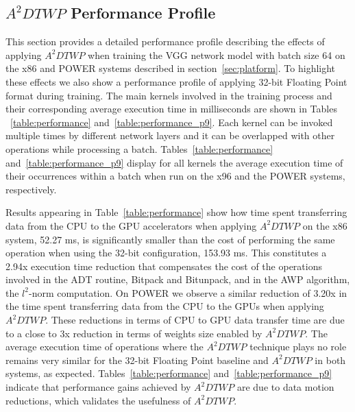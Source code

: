 \subsection{$A^2DTWP$ Performance Profile}
\label{sec:performance}
This section provides a detailed performance profile describing the effects of 
applying $A^2DTWP$ when training the VGG network model with batch size 64 on the x86 and POWER systems described in section~\ref{sec:platform}.
To highlight these effects we also show a performance profile of applying 32-bit 
Floating Point format during training.
The main kernels involved in the training process and their corresponding average execution time in milliseconds are shown in Tables ~\ref{table:performance} and~\ref{table:performance_p9}.
Each kernel can be invoked multiple times by different network layers and it can be overlapped with other operations while processing a batch.
Tables~\ref{table:performance} and~\ref{table:performance_p9} display for all kernels the average execution time of their occurrences within a batch when run on the x96 and the POWER systems, respectively.

Results appearing in Table~\ref{table:performance} show how time spent transferring 
data from the CPU to the GPU accelerators when applying $A^2DTWP$ on the x86 system, 52.27 ms, 
is significantly smaller than the cost of performing the same operation when using the 32-bit configuration, 153.93 ms. 
This constitutes a 2.94x execution time reduction that compensates the cost of the operations involved in the ADT routine, Bitpack and
Bitunpack, and in the AWP algorithm, the $l^2$-norm computation.
On POWER we observe a similar reduction of 3.20x in the time spent transferring
data from the CPU to the GPUs when applying $A^2DTWP$.
These reductions in terms of CPU to GPU data transfer time are due to a close to 3x reduction in terms of weights size enabled by $A^2DTWP$.
The average execution time of operations where the $A^2DTWP$ technique plays no role remains very similar for the 32-bit Floating Point baseline and $A^2DTWP$ in both systems, as expected.
Tables~\ref{table:performance} and~\ref{table:performance_p9} indicate that performance gains achieved by $A^2DTWP$ are due to data motion reductions, which validates the usefulness of $A^2DTWP$.

